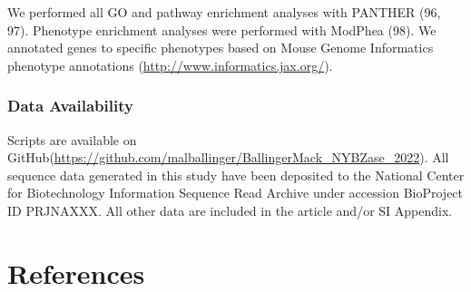 \documentclass[9pt,twocolumn,twoside,lineno]{pnas-new}
\begin{document}
We performed all GO and pathway enrichment analyses with PANTHER (96,
97). Phenotype enrichment analyses were performed with ModPhea (98). We
annotated genes to specific phenotypes based on Mouse Genome Informatics
phenotype annotations (\url{http://www.informatics.jax.org/}).

\hypertarget{data-availability}{%
\subsubsection*{Data Availability}\label{data-availability}}

Scripts are available on
GitHub(\url{https://github.com/malballinger/BallingerMack_NYBZase_2022}).
All sequence data generated in this study have been deposited to the
National Center for Biotechnology Information Sequence Read Archive
under accession BioProject ID PRJNAXXX. All other data are included in
the article and/or SI Appendix.

\showmatmethods
\showacknow
\pnasbreak

\hypertarget{references}{%
\section*{References}\label{references}}
\end{document}
